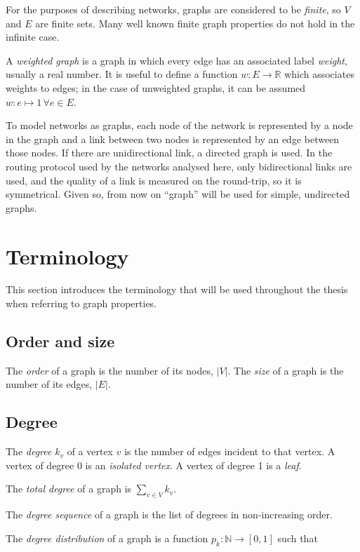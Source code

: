 \documentclass[oneside,openany]{memoir}
\begin{document}
For the purposes of describing networks, graphs are considered to be
\emph{finite}, so $V$ and $E$ are finite sets. Many well known finite
graph properties do not hold in the infinite case.

A \emph{weighted graph} is a graph in which every edge has an associated
label \emph{weight}, usually a real number. It is useful to define a
function $w: E \rightarrow \mathbb{R}$ which associates weights to
edges; in the case of unweighted graphs, it can be assumed
$w: e \mapsto 1\, \forall e \in E$.

To model networks as graphs, each node of the network is represented by
a node in the graph and a link between two nodes is represented by an
edge between those nodes. If there are unidirectional link, a directed
graph is used. In the routing protocol used by the networks analysed here,
only bidirectional links are used, and the quality of a link is measured
on the round-trip, so it is symmetrical. Given so, from now on ``graph''
will be used for simple, undirected graphs.

\section{Terminology}\label{terminology}

This section introduces the terminology that will be used throughout
the thesis when referring to graph properties.

\subsection{Order and size}\label{order-and-size}

The \emph{order} of a graph is the number of its nodes, $|V|$. The
\emph{size} of a graph is the number of its edges, $|E|$.

\subsection{Degree}\label{degree}

The \emph{degree} $k_v$ of a vertex $v$ is the number of edges incident
to that vertex. A vertex of degree 0 is an \emph{isolated vertex}. A
vertex of degree 1 is a \emph{leaf}.

The \emph{total degree} of a graph is $\sum_{v \in V} k_v$.

The \emph{degree sequence} of a graph is the list of degrees in
non-increasing order.

The \emph{degree distribution} of a graph is a function
$p_k: \mathbb{N} \rightarrow [0, 1]$ such that
\end{document}
